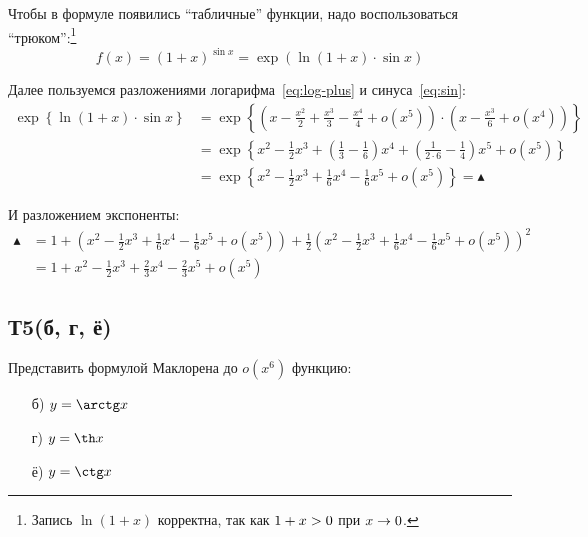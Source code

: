 \documentclass[a4paper,12pt]{article}
\begin{document}
  \begin{solution}
    Чтобы в формуле появились ``табличные'' функции, надо воспользоваться ``трюком'':\footnote{
      Запись $\ln{(1 + x)}$ корректна, так как $1 \hm+ x \hm> 0$ при $x \hm\to 0$.
    }
    \[
      f(x) = (1 + x)^{\sin x}
        = \exp{\left(\ln{(1 + x)} \cdot \sin x\right)}
    \]
    
    Далее пользуемся разложениями логарифма~\eqref{eq:log-plus} и синуса~\eqref{eq:sin}:
    \begin{equation*}
    \begin{split}
      \exp{\left\{\ln{(1 + x)} \cdot \sin x\right\}} &= \exp{\left\{
        \left(x - \frac{x^2}{2} + \frac{x^3}{3} - \frac{x^4}{4} + o(x^5)\right) \cdot \left(x - \frac{x^3}{6} + o(x^4)\right)
      \right\}}\\
      &= \exp{\left\{
        x^2 - \frac{1}{2} x^3 + \left(\frac{1}{3} - \frac{1}{6}\right) x^4 + \left(\frac{1}{2 \cdot 6} - \frac{1}{4}\right) x^5 + o(x^5)
      \right\}}\\
      &= \exp{\left\{
        x^2 - \frac{1}{2} x^3 + \frac{1}{6} x^4 - \frac{1}{6} x^5 + o(x^5)
      \right\}} = \blacktriangle
    \end{split}
    \end{equation*}
    
    И разложением экспоненты:
    \begin{equation*}
    \begin{split}
      \blacktriangle &= 1 + \left(x^2 - \frac{1}{2} x^3 + \frac{1}{6} x^4 - \frac{1}{6} x^5 + o(x^5)\right) + \frac{1}{2} \left(x^2 - \frac{1}{2} x^3 + \frac{1}{6} x^4 - \frac{1}{6} x^5 + o(x^5)\right)^2\\
      &= 1 + x^2 - \frac{1}{2} x^3 + \frac{2}{3} x^4 - \frac{2}{3} x^5 + o(x^5)
    \end{split}
    \end{equation*}
  \end{solution}
  
  
  
  
  
  \subsection{Т5(б, г, ё)}
  \label{p:T5}
  
  Представить формулой Маклорена до $o(x^6)$ функцию:
  \begin{itemize}
    \item[б)] $y = \arctg x$
    \item[г)] $y = \th x$
    \item[ё)] $y = \ctg x$
  \end{itemize}
  
\end{document}
